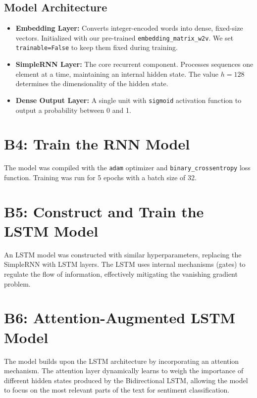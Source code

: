 \documentclass{article}
\begin{document}
\subsection*{Model Architecture}
\begin{itemize}
    \item \textbf{Embedding Layer:} Converts integer-encoded words into dense, fixed-size vectors. Initialized with our pre-trained \texttt{embedding\_matrix\_w2v}. We set \texttt{trainable=False} to keep them fixed during training.
    \item \textbf{SimpleRNN Layer:} The core recurrent component. Processes sequences one element at a time, maintaining an internal hidden state. The value $h=128$ determines the dimensionality of the hidden state.
    \item \textbf{Dense Output Layer:} A single unit with \texttt{sigmoid} activation function to output a probability between 0 and 1.
\end{itemize}

\section{B4: Train the RNN Model}
The model was compiled with the \texttt{adam} optimizer and \texttt{binary\_crossentropy} loss function. Training was run for 5 epochs with a batch size of 32.

\section{B5: Construct and Train the LSTM Model}
An LSTM model was constructed with similar hyperparameters, replacing the SimpleRNN with LSTM layers. The LSTM uses internal mechanisms (gates) to regulate the flow of information, effectively mitigating the vanishing gradient problem.

\section{B6: Attention-Augmented LSTM Model}
The model builds upon the LSTM architecture by incorporating an attention mechanism. The attention layer dynamically learns to weigh the importance of different hidden states produced by the Bidirectional LSTM, allowing the model to focus on the most relevant parts of the text for sentiment classification.
\end{document}
